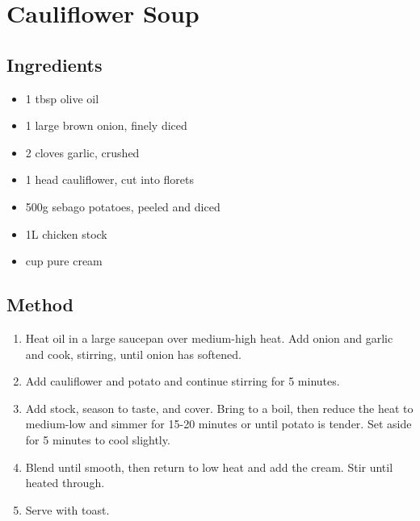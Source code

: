 \section{Cauliflower Soup}


\subsection{Ingredients}

\begin{itemize}
	\item 1 tbsp olive oil
	\item 1 large brown onion, finely diced
	\item 2 cloves garlic, crushed
	\item 1 head cauliflower, cut into florets
	\item 500g sebago potatoes, peeled and diced
	\item 1L chicken stock
	\item {} cup pure cream
\end{itemize}

\subsection{Method}

\begin{enumerate}
	\item Heat oil in a large saucepan over medium-high heat. Add onion and garlic and cook, stirring, until onion has softened.
	\item Add cauliflower and potato and continue stirring for 5 minutes.
	\item Add stock, season to taste, and cover. Bring to a boil, then reduce the heat to medium-low and simmer for 15-20 minutes or until potato is tender. Set aside for 5 minutes to cool slightly.
	\item Blend until smooth, then return to low heat and add the cream. Stir until heated through.
	\item Serve with toast.
\end{enumerate}
